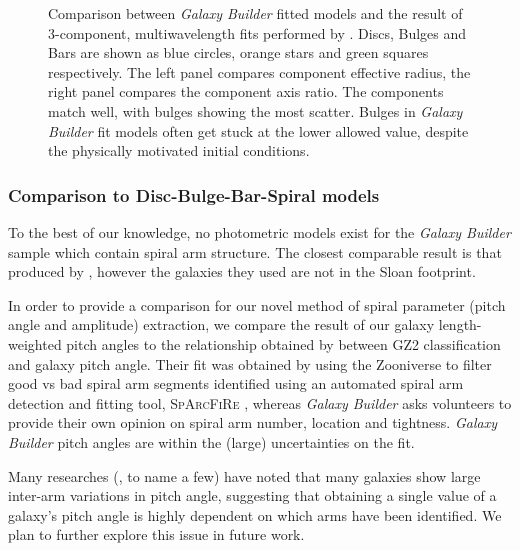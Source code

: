 \documentclass[../main.tex]{subfiles}
\begin{document}
\begin{figure}
  \caption{Comparison between \textit{Galaxy Builder} fitted models and the result of 3-component, multi\-wavelength fits performed by \citet{2018MNRAS.473.4731K}. Discs, Bulges and Bars are shown as blue circles, orange stars and green squares respectively. The left panel compares component effective radius, the right panel compares the component axis ratio. The components match well, with bulges showing the most scatter. Bulges in \textit{Galaxy Builder} fit models often get stuck at the lower allowed value, despite the physically motivated initial conditions.}
  \label{fig:sd_comp_comparison}
\end{figure}

\subsubsection{Comparison to Disc-Bulge-Bar-Spiral models}
To the best of our knowledge, no photometric models exist for the \textit{Galaxy Builder} sample which contain spiral arm structure. The closest comparable result is that produced by \citet{Gao2017:1709.00746v1}, however the galaxies they used are not in the Sloan footprint.

In order to provide a comparison for our novel method of spiral parameter (pitch angle and amplitude) extraction, we compare the result of our galaxy length-weighted pitch angles to the relationship obtained by \citet{Hart2016:1607.01019v1} between GZ2 classification and galaxy pitch angle. Their fit was obtained by using the Zooniverse to filter good vs bad spiral arm segments identified using an automated spiral arm detection and fitting tool, \textsc{SpArcFiRe} \citep{Davis2014:1402.1910v1}, whereas \textit{Galaxy Builder} asks volunteers to provide their own opinion on spiral arm number, location and tightness. \textit{Galaxy Builder} pitch angles are within the (large) uncertainties on the \citet{Hart2016:1607.01019v1} fit.

Many researches (\citealt{Davis2014:1402.1910v1}, \citealt{2019arXiv190804246D} to name a few) have noted that many galaxies show large inter-arm variations in pitch angle, suggesting that obtaining a single value of a galaxy's pitch angle is highly dependent on which arms have been identified. We plan to further explore this issue in future work.
\end{document}
